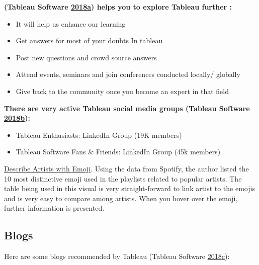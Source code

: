 \documentclass[]{book}
\providecommand{\tightlist}{%
  \setlength{\itemsep}{0pt}\setlength{\parskip}{0pt}}
\begin{document}
\textbf{(Tableau Software
\protect\hyperlink{ref-Tableau_Community}{2018}\protect\hyperlink{ref-Tableau_Community}{a})
helps you to explore Tableau further :}

\begin{itemize}
\tightlist
\item
  It will help us enhance our learning
\item
  Get answers for most of your doubts In tableau
\item
  Post new questions and crowd source answers
\item
  Attend events, seminars and join conferences conducted locally/
  globally
\item
  Give back to the community once you become an expert in that field
\end{itemize}

\textbf{There are very active Tableau social media groups (Tableau
Software
\protect\hyperlink{ref-LinkedIn_Groups}{2018}\protect\hyperlink{ref-LinkedIn_Groups}{b}):}

\begin{itemize}
\tightlist
\item
  Tableau Enthusiasts: LinkedIn Group (19K members)
\item
  Tableau Software Fans \& Friends: LinkedIn Group (45k members)
\end{itemize}

\href{https://public.tableau.com/en-us/s/gallery/what-emoji-say-about-music?gallery=featured}{Describe
Artists with Emoji}. Using the data from Spotify, the author listed the
10 most distinctive emoji used in the playlists related to popular
artists. The table being used in this visual is very straight-forward to
link artist to the emojis and is very easy to compare among artists.
When you hover over the emoji, further information is presented.

\subsection{Blogs}\label{blogs-1}

Here are some blogs recommended by Tableau (Tableau Software
\protect\hyperlink{ref-Top_10_Blogs}{2018}\protect\hyperlink{ref-Top_10_Blogs}{c}):
\end{document}
